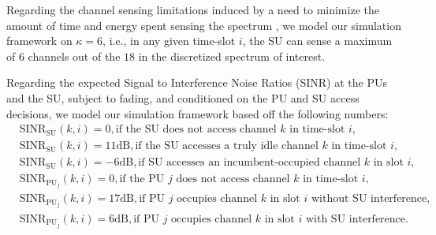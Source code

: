 \documentclass[12pt, draftcls, onecolumn]{IEEEtran}
\begin{document}
Regarding the channel sensing limitations induced by a need to minimize the amount of time and energy spent sensing the spectrum \cite{WCL:3}, we model our simulation framework on $\kappa{=}6$, i.e., in any given time-slot $i$, the SU can sense a maximum of $6$ channels out of the $18$ in the discretized spectrum of interest.

Regarding the expected Signal to Interference Noise Ratios (SINR) at the PUs and the SU, subject to fading, and conditioned on the PU and SU access decisions, we model our simulation framework based off the following numbers:
\begin{align*}
    &\text{SINR}_{\text{SU}}(k,i){=}0,\text{if the SU does not access channel $k$ in time-slot $i$,}\\
    &\text{SINR}_{\text{SU}}(k,i){=}11\text{dB},\text{if the SU accesses a truly idle channel $k$ in time-slot $i$,}\\
    &\text{SINR}_{\text{SU}}(k,i){=}-6\text{dB},\text{if SU accesses an incumbent-occupied channel $k$ in slot $i$,}\\
    &\text{SINR}_{\text{PU}_{j}}(k,i){=}0,\text{if the PU $j$ does not access channel $k$ in time-slot $i$,}\\
    &\text{SINR}_{\text{PU}_{j}}(k,i){=}17\text{dB},\text{if PU $j$ occupies channel $k$ in slot $i$ without SU interference,}\\
    &\text{SINR}_{\text{PU}_{j}}(k,i){=}6\text{dB},\text{if PU $j$ occupies channel $k$ in slot $i$ with SU interference.}
\end{align*}
\end{document}
